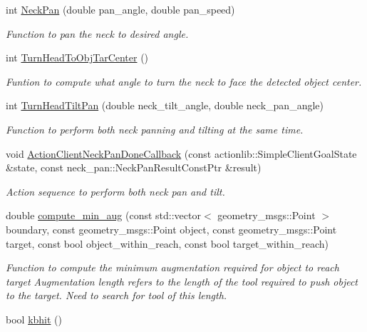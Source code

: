 \begin{DoxyCompactItemize}
int \hyperlink{structManipulate_ad830a25f512992ea9629b49763ea72a7}{Neck\+Pan} (double pan\+\_\+angle, double pan\+\_\+speed)
\begin{DoxyCompactList}\small\item\em Function to pan the neck to desired angle. \end{DoxyCompactList}\item 
int \hyperlink{structManipulate_aad305b9b5bc679d1c13754bdd8c73127}{Turn\+Head\+To\+Obj\+Tar\+Center} ()
\begin{DoxyCompactList}\small\item\em Funtion to compute what angle to turn the neck to face the detected object center. \end{DoxyCompactList}\item 
int \hyperlink{structManipulate_a32c081d7276be31a467cde4ab4e9c9e3}{Turn\+Head\+Tilt\+Pan} (double neck\+\_\+tilt\+\_\+angle, double neck\+\_\+pan\+\_\+angle)
\begin{DoxyCompactList}\small\item\em Function to perform both neck panning and tilting at the same time. \end{DoxyCompactList}\item 
void \hyperlink{structManipulate_a0611b33a34a32092d6265b06e4074d73}{Action\+Client\+Neck\+Pan\+Done\+Callback} (const actionlib\+::\+Simple\+Client\+Goal\+State \&state, const neck\+\_\+pan\+::\+Neck\+Pan\+Result\+Const\+Ptr \&result)
\begin{DoxyCompactList}\small\item\em Action sequence to perform both neck pan and tilt. \end{DoxyCompactList}\item 
double \hyperlink{structManipulate_a2e95c0cd30bc9c8a3d712d681d70ab3d}{compute\+\_\+min\+\_\+aug} (const std\+::vector$<$ geometry\+\_\+msgs\+::\+Point $>$ boundary, const geometry\+\_\+msgs\+::\+Point object, const geometry\+\_\+msgs\+::\+Point target, const bool object\+\_\+within\+\_\+reach, const bool target\+\_\+within\+\_\+reach)
\begin{DoxyCompactList}\small\item\em Function to compute the minimum augmentation required for object to reach target Augmentation length refers to the length of the tool required to push object to the target. Need to search for tool of this length. \end{DoxyCompactList}\item 
bool \hyperlink{structManipulate_a404bf3531c8b6368c0b317062b3c30e4}{kbhit} ()

\end{DoxyCompactItemize}
